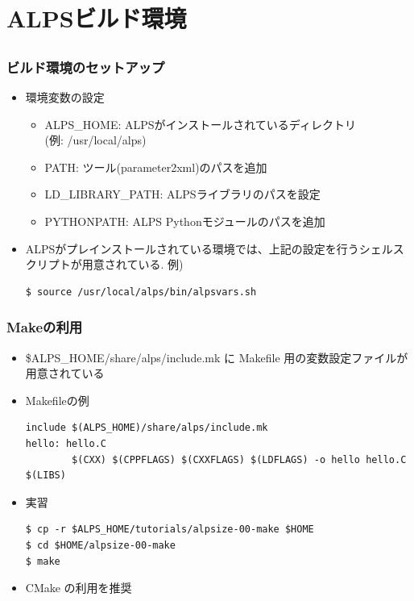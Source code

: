 \section{ALPSビルド環境}
\subsection*{\redm\whitem\greenb}

\begin{frame}[c,fragile]
  \frametitle{ビルド環境のセットアップ}
  \begin{itemize}
    \setlength{\itemsep}{1em}
  \item 環境変数の設定
    \begin{itemize}
    \item {\color{red} ALPS\_HOME}: ALPSがインストールされているディレクトリ\\ (例: /usr/local/alps)
    \item {\color{red} PATH}: ツール(parameter2xml)のパスを追加
    \item {\color{red} LD\_LIBRARY\_PATH}: ALPSライブラリのパスを設定
    \item {\color{red} PYTHONPATH}: ALPS Pythonモジュールのパスを追加
    \end{itemize}
  \item ALPSがプレインストールされている環境では、上記の設定を行うシェルスクリプトが用意されている. 例)
\begin{lstlisting}
$ source /usr/local/alps/bin/alpsvars.sh
\end{lstlisting}
  \end{itemize}
\end{frame}

\begin{frame}[c,fragile]
  \frametitle{Makeの利用}
  \begin{itemize}
  \item \$ALPS\_HOME/share/alps/include.mk に Makefile 用の変数設定ファイルが用意されている
  \item Makefileの例
\begin{lstlisting}
include $(ALPS_HOME)/share/alps/include.mk
hello: hello.C
        $(CXX) $(CPPFLAGS) $(CXXFLAGS) $(LDFLAGS) -o hello hello.C $(LIBS)
\end{lstlisting}
  \item 実習
\begin{lstlisting}
$ cp -r $ALPS_HOME/tutorials/alpsize-00-make $HOME
$ cd $HOME/alpsize-00-make
$ make
\end{lstlisting}
  \item {\color{blue} CMake の利用を推奨}
  \end{itemize}
\end{frame}

